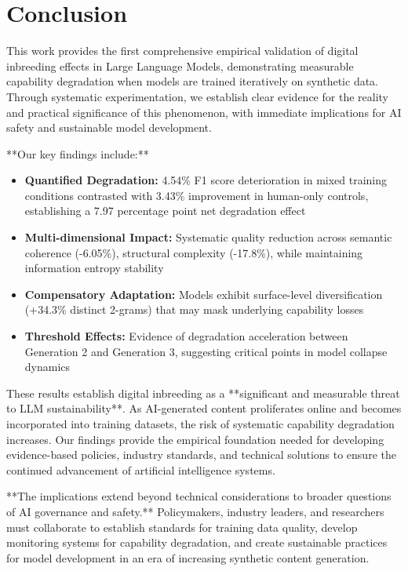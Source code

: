 \documentclass{article}
\begin{document}
\section{Conclusion}

This work provides the first comprehensive empirical validation of digital inbreeding effects in Large Language Models, demonstrating measurable capability degradation when models are trained iteratively on synthetic data. Through systematic experimentation, we establish clear evidence for the reality and practical significance of this phenomenon, with immediate implications for AI safety and sustainable model development.

**Our key findings include:**

\begin{itemize}
\item \textbf{Quantified Degradation:} 4.54\% F1 score deterioration in mixed training conditions contrasted with 3.43\% improvement in human-only controls, establishing a 7.97 percentage point net degradation effect
\item \textbf{Multi-dimensional Impact:} Systematic quality reduction across semantic coherence (-6.05\%), structural complexity (-17.8\%), while maintaining information entropy stability
\item \textbf{Compensatory Adaptation:} Models exhibit surface-level diversification (+34.3\% distinct 2-grams) that may mask underlying capability losses
\item \textbf{Threshold Effects:} Evidence of degradation acceleration between Generation 2 and Generation 3, suggesting critical points in model collapse dynamics
\end{itemize}

These results establish digital inbreeding as a **significant and measurable threat to LLM sustainability**. As AI-generated content proliferates online and becomes incorporated into training datasets, the risk of systematic capability degradation increases. Our findings provide the empirical foundation needed for developing evidence-based policies, industry standards, and technical solutions to ensure the continued advancement of artificial intelligence systems.

**The implications extend beyond technical considerations to broader questions of AI governance and safety.** Policymakers, industry leaders, and researchers must collaborate to establish standards for training data quality, develop monitoring systems for capability degradation, and create sustainable practices for model development in an era of increasing synthetic content generation.
\end{document}
